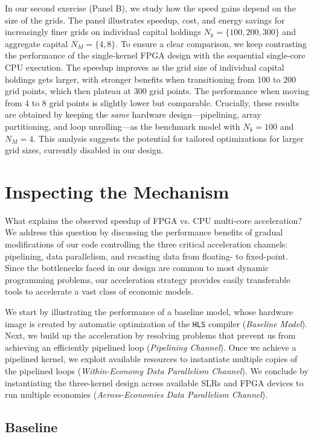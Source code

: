 \documentclass[12pt,american]{article}
\begin{document}
In our second exercise (Panel B), we study how the speed gains depend on the size of the grids. The panel illustrates speedup, cost, and energy savings for increasingly finer grids on individual capital holdings $N_{k}=\{100,200,300\}$ and aggregate capital $N_{M}=\{4,8\}$. To ensure a clear comparison, we keep contrasting the performance of the single-kernel FPGA design with the sequential single-core CPU execution. The speedup improves as the grid size of individual capital holdings gets larger, with stronger benefits when transitioning from 100 to 200 grid points, which then plateau at 300 grid points. The performance when moving from 4 to 8 grid points is slightly lower but comparable. Crucially, these results are obtained by keeping the \textit{same} hardware design---pipelining, array partitioning, and loop unrolling---as the benchmark model with $N_{k}=100$ and $N_{M}=4$. This analysis suggests the potential for tailored optimizations for larger grid sizes, currently disabled in our design.

\section{Inspecting the Mechanism}\label{sec:acc}

What explains the observed speedup of FPGA vs. CPU multi-core acceleration?  We address this question by discussing the performance benefits of gradual modifications of our code controlling the three critical acceleration channels: pipelining, data parallelism, and recasting data from floating- to fixed-point. Since the bottlenecks faced in our design are common to most dynamic programming problems, our acceleration strategy provides easily transferable tools to accelerate a vast class of economic models.

We start by illustrating the performance of a baseline model, whose hardware image is created by automatic optimization of the \texttt{HLS} compiler (\textit{Baseline Model}). Next, we build up the acceleration by resolving problems that prevent us from achieving an efficiently pipelined loop (\textit{Pipelining Channel}). Once we achieve a pipelined kernel, we exploit available resources to instantiate multiple copies of the pipelined loops (\textit{Within-Economy Data Parallelism Channel}). We conclude by instantiating the three-kernel design across available SLRs and FPGA devices to run multiple economies (\textit{Across-Economies Data Parallelism Channel}).

\subsection{Baseline}\label{sec:baseline}
\end{document}
